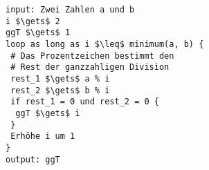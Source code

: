 %
%
\begin{minipage}{\linewidth}
\begin{lstlisting}[language=pseudocode, caption={Algorithmus für das Problem \protect\autoref{problem-ggt-2-zahlen}}]
input: Zwei Zahlen a und b
i $\gets$ 2
ggT $\gets$ 1
loop as long as i $\leq$ minimum(a, b) {
 # Das Prozentzeichen bestimmt den
 # Rest der ganzzahligen Division
 rest_1 $\gets$ a % i
 rest_2 $\gets$ b % i
 if rest_1 = 0 und rest_2 = 0 {
  ggT $\gets$ i
 }
 Erhöhe i um 1
}
output: ggT
\end{lstlisting}
\end{minipage}
\vfill

